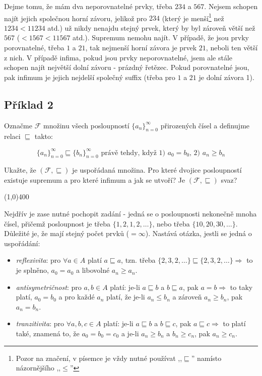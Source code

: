 \documentclass{article}
\begin{document}
Dejme tomu, že mám dva neporovnatelné prvky, třeba \(234\) a \(567\). Nejsem schopen najít jejich společnou horní závoru, jelikož pro $234$ (který je menší\footnote{Pozor na značení, v písemce je vždy nutné používat ,,\(\sqsubseteq\)'' namísto názornějšího ,,\(\leq\)''} než \(1234 < 11234\) atd.) už nikdy nenajdu stejný prvek, který by byl zároveň větší než $567$ ($< 1567 < 11567$ atd.). Supremum nemohu najít. V případě, že jsou prvky porovnatelné, třeba $1$ a $21$, tak nejmenší horní závora je prvek $21$, neboli ten větší z nich. V případě infima, pokud jsou prvky neporovnatelné, jsem ale stále schopen najít největší dolní závoru - prázdný řetězec. Pokud porovnatelné jsou, pak infimum je jejich nejdelší společný suffix (třeba pro $1$ a $21$ je dolní závora 1).  

\subsection{Příklad 2}
Označme $\mathcal{F}$ množinu všech posloupností $\{a_n\}^{\infty}_{n=0}$ přirozených čísel a definujme relaci $\sqsubseteq$ takto:

\[ \{a_n\}^{\infty}_{n=0} \sqsubseteq \{b_n\}^{\infty}_{n=0} \text{ právě tehdy, když 1) } a_0 = b_0 \text {, 2) } a_n \geq b_n \]

Ukažte, že $(\mathcal{F},\sqsubseteq)$ je uspořádaná množina. Pro které dvojice posloupností existuje supremum a pro které infimum a jak se utvoří? Je $(\mathcal{F},\sqsubseteq)$ svaz? 
 
\line(1,0){400}

Nejdřív je zase nutné pochopit zadání - jedná se o posloupnosti nekonečně mnoha čísel, přičemž posloupnost je třeba $\{1,2,1,2,\ldots\}$, nebo třeba $\{10,20,30,\ldots\}$. Důležité je, že mají stejný počet prvků ($=\infty$). Nastává otázka, jestli se jedná o uspořádání:

\begin{itemize}
 \item \emph{reflexivita}: pro $\forall a \in A$ platí $a \sqsubseteq a$, tzn. třeba $\{2,3,2,\ldots\} \sqsubseteq \{2,3,2,\ldots\} \Rightarrow$ to je splněno, $a_0 = a_0$ a libovolné $a_n \geq a_n$.
 \item \emph{antisymetričnost}: pro $a,b \in A$ platí: je-li $a \sqsubseteq b$ a $b \sqsubseteq a$, pak $a = b \Rightarrow$ to taky platí, $a_0 = b_0$ a pro každé $a_n$ platí, že je-li $a_n \leq b_n$ a zároveň $a_n \geq b_n$, pak $a_n = b_n$.
 \item \emph{tranzitivita}:  pro $\forall a,b,c \in A$ platí: je-li $a \sqsubseteq b$ a $b \sqsubseteq c$, pak $a \sqsubseteq c \Rightarrow$ to platí také, znamená to, že $a_0 = b_0 = c_0$ a je-li $a_n \geq b_n$ a $b_n \geq c_n$, pak $a_n \geq c_n$. 
\end{itemize} 
\end{document}
